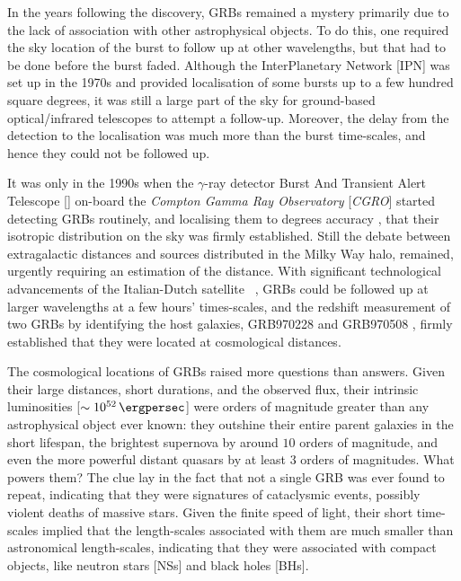 In the years following the discovery, GRBs remained a mystery primarily due to the lack of association with other astrophysical objects. To do this, one required the sky location of the burst to follow up at other wavelengths, but that had to be done before the burst faded. Although the InterPlanetary Network [IPN] \citep{Cline_and_Desai-1976-Ap&SS} was set up in the 1970s and provided localisation of some bursts up to a few hundred square degrees, it was still a large part of the sky for ground-based optical/infrared telescopes to attempt a follow-up. Moreover, the delay from the detection to the localisation was much more than the burst time-scales, and hence they could not be followed up.

It was only in the 1990s when the $\gamma$-ray detector Burst And Transient Alert Telescope [\B] \citep{Fishman_et_al.-1989-BAAS} on-board the \emph{Compton Gamma Ray Observatory} [\emph{CGRO}] started detecting GRBs routinely, and localising them to degrees accuracy \citep{Briggs-1995-Ap&SS}, that their isotropic distribution on the sky was firmly established. Still the debate between extragalactic distances and sources distributed in the Milky Way halo, remained, urgently requiring an estimation of the distance. With significant technological advancements of the Italian-Dutch satellite \bs\ \citep{Boella_et_al.-1997-A&AS}, GRBs could be followed up at larger wavelengths at a few hours' times-scales, and the redshift measurement of two GRBs by identifying the host galaxies, GRB970228 \citep{van_Paradijs_et_al.-1997-Nature} and GRB970508 \citep{Metzger_et_al.-1997-Nature}, firmly established that they were located at cosmological distances.

The cosmological locations of GRBs raised more questions than answers. Given their large distances, short durations, and the observed flux, their intrinsic luminosities [$\sim 10^{52} \, \ergpersec$] were orders of magnitude greater than any astrophysical object ever known: they outshine their entire parent galaxies in the short lifespan, the brightest supernova by around $10$ orders of magnitude, and even the more powerful distant quasars by at least $3$ orders of magnitudes. What powers them? The clue lay in the fact that not a single GRB was ever found to repeat, indicating that they were signatures of cataclysmic events, possibly violent deaths of massive stars. Given the finite speed of light, their short time-scales implied that the length-scales associated with them are much smaller than astronomical length-scales, indicating that they were associated with compact objects, like neutron stars [NSs] and black holes [BHs].


